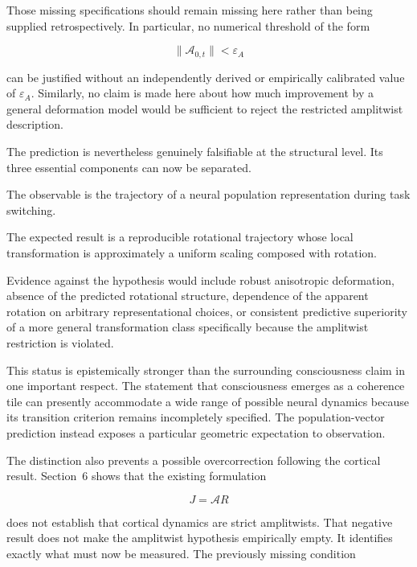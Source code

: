 \documentclass[11pt]{article}
\begin{document}
Those missing specifications should remain missing here rather than being supplied retrospectively. In particular, no numerical threshold of the form

\begin{equation}
\|\mathcal A_{0,t}\|<\varepsilon_A
\end{equation}

can be justified without an independently derived or empirically calibrated value of $\varepsilon_A$. Similarly, no claim is made here about how much improvement by a general deformation model would be sufficient to reject the restricted amplitwist description.

The prediction is nevertheless genuinely falsifiable at the structural level. Its three essential components can now be separated.

The observable is the trajectory of a neural population representation during task switching.

The expected result is a reproducible rotational trajectory whose local transformation is approximately a uniform scaling composed with rotation.

Evidence against the hypothesis would include robust anisotropic deformation, absence of the predicted rotational structure, dependence of the apparent rotation on arbitrary representational choices, or consistent predictive superiority of a more general transformation class specifically because the amplitwist restriction is violated.

This status is epistemically stronger than the surrounding consciousness claim in one important respect. The statement that consciousness emerges as a coherence tile can presently accommodate a wide range of possible neural dynamics because its transition criterion remains incompletely specified. The population-vector prediction instead exposes a particular geometric expectation to observation.

The distinction also prevents a possible overcorrection following the cortical result. Section~6 shows that the existing formulation

\begin{equation}
J=\mathcal A R
\end{equation}

does not establish that cortical dynamics are strict amplitwists. That negative result does not make the amplitwist hypothesis empirically empty. It identifies exactly what must now be measured. The previously missing condition
\end{document}
